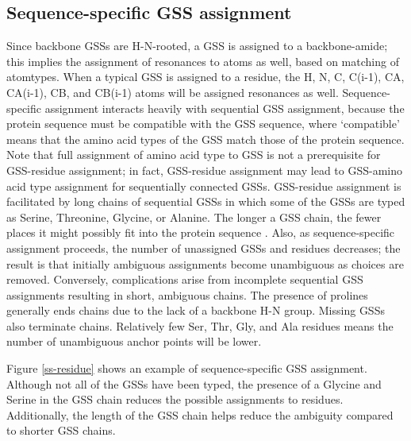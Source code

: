 \subsection{Sequence-specific GSS assignment}
Since backbone GSSs are H-N-rooted, a GSS is assigned to a 
backbone-amide; this implies the assignment of resonances to atoms as well, 
based on matching of atomtypes.  When a typical GSS is assigned to a residue, 
the H, N, C, C(i-1), CA, CA(i-1), CB, and CB(i-1) atoms will be assigned 
resonances as well.  Sequence-specific assignment interacts heavily with 
sequential GSS assignment, because the protein sequence must be compatible 
with the GSS sequence, where `compatible' means that the amino acid types 
of the GSS match those of the protein sequence.  Note that full assignment 
of amino acid type to GSS is not a prerequisite for GSS-residue assignment; 
in fact, GSS-residue assignment may lead to GSS-amino acid type assignment 
for sequentially connected GSSs.  GSS-residue assignment is facilitated by 
long chains of sequential GSSs in which some of the GSSs are typed as Serine, 
Threonine, Glycine, or Alanine.  The longer a GSS chain, the fewer places it 
might possibly fit into the protein sequence \cite{saga}.  Also, 
as sequence-specific assignment proceeds, the number of unassigned GSSs and 
residues decreases; the result is that initially ambiguous assignments become 
unambiguous as choices are removed.  Conversely, complications arise from 
incomplete sequential GSS assignments resulting in short, ambiguous chains.  
The presence of prolines generally ends chains due to the lack of a backbone 
H-N group.  Missing GSSs also terminate chains.  Relatively few Ser, Thr, Gly, 
and Ala residues means the number of unambiguous anchor points will be lower.

Figure \ref{ss-residue} shows an example of sequence-specific GSS assignment.
Although not all of the GSSs have been typed, the presence of a Glycine and
Serine in the GSS chain reduces the possible assignments to residues.
Additionally, the length of the GSS chain helps reduce the ambiguity compared
to shorter GSS chains.

